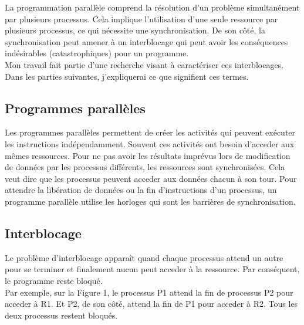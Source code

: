 \documentclass[12pt]{scrartcl}
\begin{document}
La programmation parallèle comprend la résolution d'un problème simultanément par plusieurs processus.
Cela implique l'utilisation d'une seule ressource par plusieurs processus, ce qui nécessite une synchronisation.
De son côté, la synchronisation peut amener à un interblocage qui peut avoir les conséquences indésirables (catastrophiques) pour un programme. \\
Mon travail fait partie d'une recherche visant à caractériser ces interblocages.\\
Dans les parties suivantes, j'expliquerai ce que signifient ces termes.   
\subsection{Programmes parallèles}

Les programmes parallèles permettent de créer les activités qui peuvent exécuter les instructions indépendamment. 
Souvent ces activités ont besoin d'acceder aux mêmes ressources. 
Pour ne pas avoir les résultats imprévus lors de modification de données par les processus différents, les ressources sont synchronisées. 
Cela veut dire que les processus peuvent acceder aux données chacun à son tour. 
Pour attendre la libération de données ou la fin d'instructions d'un processus, un programme parallèle utilise les horloges qui sont les barrières de synchronisation.
\newpage
\subsection{Interblocage}

Le problème d'interblocage apparaît quand chaque processus attend un autre pour se terminer et finalement aucun peut acceder à la ressource.
Par conséquent, le programme reste bloqué.\\

Par exemple, sur la Figure 1, le processus P1 attend la fin de processus P2 pour acceder à R1. Et P2, de son côté, attend la fin de P1 pour acceder à R2. Tous les deux processus restent bloqués.\\
\end{document}

